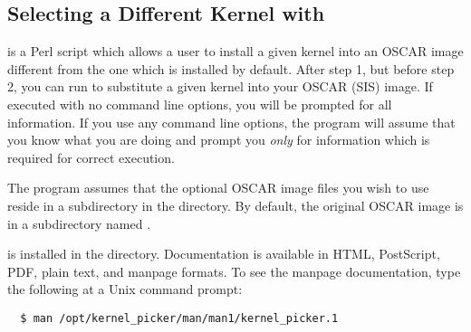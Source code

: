 
\subsection{Selecting a Different Kernel with }
\label{app:kernel-picker-overview}

 is a Perl script which allows a user to install a
given kernel into an OSCAR image different from the one which is
installed by default.  After step 1, but before step 2, you can run
 to substitute a given kernel into your OSCAR
(SIS) image.  If executed with no command line options, you will be
prompted for all information.  If you use any command line options,
the program will assume that you know what you are doing and prompt
you {\em only} for information which is required for correct
execution.

The  program assumes that the optional OSCAR image
files you wish to use reside in a subdirectory in the
 directory.  By default, the
original OSCAR image is in a subdirectory named .

 is installed in the
 directory.  Documentation is available
in HTML, PostScript, PDF, plain text, and manpage formats.  To see the
manpage documentation, type the following at a Unix command prompt:

\begin{verbatim}
  $ man /opt/kernel_picker/man/man1/kernel_picker.1
\end{verbatim}
